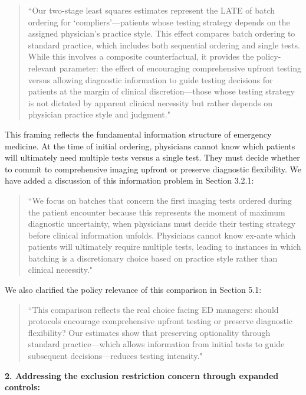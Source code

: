 \documentclass[11pt]{article}
\newcommand{\1}{\hbox{\rm 1\kern-.35em 1}}
\begin{document}
\begin{quote}
``Our two-stage least squares estimates represent the LATE of batch ordering for `compliers'---patients whose testing strategy depends on the assigned physician's practice style. This effect compares batch ordering to standard practice, which includes both sequential ordering and single tests. While this involves a composite counterfactual, it provides the policy-relevant parameter: the effect of encouraging comprehensive upfront testing versus allowing diagnostic information to guide testing decisions for patients at the margin of clinical discretion—those whose testing strategy is not dictated by apparent clinical necessity but rather depends on physician practice style and judgment."
\end{quote}

This framing reflects the fundamental information structure of emergency medicine. At the time of initial ordering, physicians cannot know which patients will ultimately need multiple tests versus a single test. They must decide whether to commit to comprehensive imaging upfront or preserve diagnostic flexibility. We have added a discussion of this information problem in Section 3.2.1:

\begin{quote}
``We focus on batches that concern the first imaging tests ordered during the patient encounter because this represents the moment of maximum diagnostic uncertainty, when physicians must decide their testing strategy before clinical information unfolds. Physicians cannot know ex-ante which patients will ultimately require multiple tests, leading to instances in which batching is a discretionary choice based on practice style rather than clinical necessity."
\end{quote}

We also clarified the policy relevance of this comparison in Section 5.1:

\begin{quote}
``This comparison reflects the real choice facing ED managers: should protocols encourage comprehensive upfront testing or preserve diagnostic flexibility? Our estimates show that preserving optionality through standard practice---which allows information from initial tests to guide subsequent decisions---reduces testing intensity."
\end{quote}

\textbf{2. Addressing the exclusion restriction concern through expanded controls:}
\end{document}
